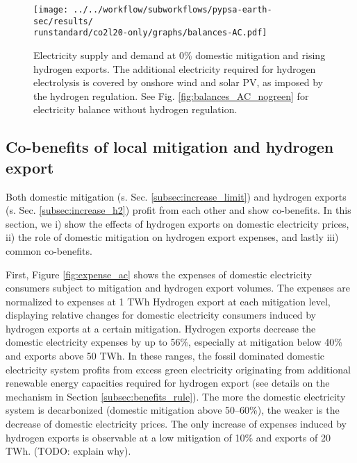 

\begin{figure}[h!]
    \centering
    \texttt{[image: ../../workflow/subworkflows/pypsa-earth-sec/results/\\runstandard/co2l20-only/graphs/balances-AC.pdf]}
    \caption{Electricity supply and demand at 0\% 
    domestic mitigation and rising hydrogen exports. The additional electricity required for hydrogen electrolysis is covered by onshore wind and solar PV, as imposed by the hydrogen regulation. See Fig. \ref{fig:balances_AC_nogreen} for electricity balance without hydrogen regulation.}
    \label{fig:balances-ac-co2l20}
\end{figure}


\subsection{Co-benefits of local mitigation and hydrogen export}
\label{subsec:benefits}

Both domestic mitigation (s. Sec. \ref{subsec:increase_limit}) and hydrogen exports (s. Sec. \ref{subsec:increase_h2}) profit from each other and show co-benefits. In this section, we i) show the effects of hydrogen exports on domestic electricity prices, ii) the role of domestic mitigation on hydrogen export expenses, and lastly iii) common co-benefits.

First, Figure \ref{fig:expense_ac} shows the expenses of domestic electricity consumers subject to mitigation and hydrogen export volumes. The expenses are normalized to expenses at 1 TWh Hydrogen export at each mitigation level, displaying relative changes for domestic electricity consumers induced by hydrogen exports at a certain mitigation.
Hydrogen exports decrease the domestic electricity expenses by up to 56\%, especially at mitigation below 40\% and exports above 50 TWh. In these ranges, the fossil dominated domestic electricity system profits from excess green electricity originating from additional renewable energy capacities required for hydrogen export (see details on the mechanism in Section \ref{subsec:benefits_rule}). The more the domestic electricity system is decarbonized (domestic mitigation above 50--60\%), the weaker is the decrease of domestic electricity prices.
The only increase of expenses induced by hydrogen exports is observable at a low mitigation of 10\% and exports of 20 TWh. (TODO: explain why).


